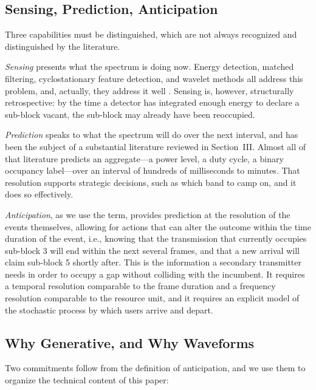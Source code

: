 \documentclass[lettersize,journal]{IEEEtran}
\begin{document}
\subsection{\textbf{Sensing, Prediction, Anticipation}}
Three capabilities must be distinguished, which are not 
always recognized and distinguished by the literature. 

\emph{Sensing} presents what the spectrum is doing now.
Energy detection, matched filtering, cyclostationary feature detection,
and wavelet methods all address this problem, and, actually, they address it well
\cite{Yucek2009, Muzaffar2024, FontSegura2010, Tian2006}.
Sensing is, however, structurally retrospective: by the time a detector has
integrated enough energy to declare a sub-block vacant, the sub-block
may already have been reoccupied.

\emph{Prediction} speaks to what the spectrum will do over the next
interval, and has been the subject of a substantial literature reviewed in
Section~III.
Almost all of that literature predicts an
aggregate---a power level, a duty cycle, a binary occupancy
label---over an interval of hundreds of milliseconds to minutes.
That resolution supports strategic decisions, such as which band to camp on,
and it does so effectively.

\emph{Anticipation}, as we use the term, provides prediction at the resolution
of the events themselves, allowing for actions that can alter the outcome
within the time duration of the event, i.e., knowing that the transmission that
currently occupies sub-block 3 will end within the next several frames, and that
a new arrival will claim sub-block 5 shortly after.
This is the information a
secondary transmitter needs in order to occupy a gap without
colliding with the incumbent.
It requires a temporal resolution
comparable to the frame duration and a frequency resolution comparable
to the resource unit, and it requires an explicit model of the
stochastic process by which users arrive and depart.
\subsection{\textbf{Why Generative, and Why Waveforms}}
Two commitments follow from the definition of anticipation, and we use them to
organize the technical content of this paper:
\end{document}
